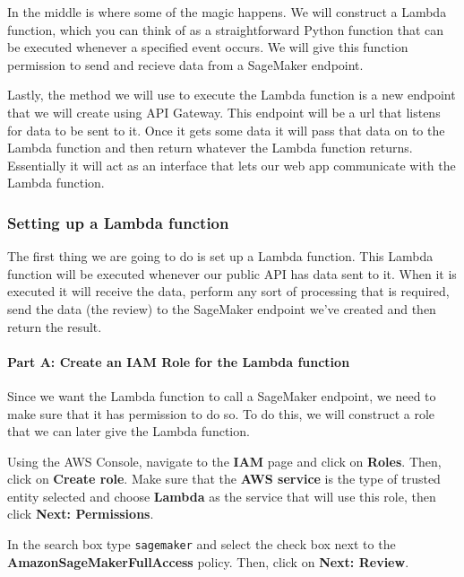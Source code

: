 \documentclass[11pt]{article}
\begin{document}
In the middle is where some of the magic happens. We will construct a
Lambda function, which you can think of as a straightforward Python
function that can be executed whenever a specified event occurs. We will
give this function permission to send and recieve data from a SageMaker
endpoint.

Lastly, the method we will use to execute the Lambda function is a new
endpoint that we will create using API Gateway. This endpoint will be a
url that listens for data to be sent to it. Once it gets some data it
will pass that data on to the Lambda function and then return whatever
the Lambda function returns. Essentially it will act as an interface
that lets our web app communicate with the Lambda function.

\hypertarget{setting-up-a-lambda-function}{%
\subsubsection{Setting up a Lambda
function}\label{setting-up-a-lambda-function}}

The first thing we are going to do is set up a Lambda function. This
Lambda function will be executed whenever our public API has data sent
to it. When it is executed it will receive the data, perform any sort of
processing that is required, send the data (the review) to the SageMaker
endpoint we've created and then return the result.

\hypertarget{part-a-create-an-iam-role-for-the-lambda-function}{%
\paragraph{Part A: Create an IAM Role for the Lambda
function}\label{part-a-create-an-iam-role-for-the-lambda-function}}

Since we want the Lambda function to call a SageMaker endpoint, we need
to make sure that it has permission to do so. To do this, we will
construct a role that we can later give the Lambda function.

Using the AWS Console, navigate to the \textbf{IAM} page and click on
\textbf{Roles}. Then, click on \textbf{Create role}. Make sure that the
\textbf{AWS service} is the type of trusted entity selected and choose
\textbf{Lambda} as the service that will use this role, then click
\textbf{Next: Permissions}.

In the search box type \texttt{sagemaker} and select the check box next
to the \textbf{AmazonSageMakerFullAccess} policy. Then, click on
\textbf{Next: Review}.
\end{document}

